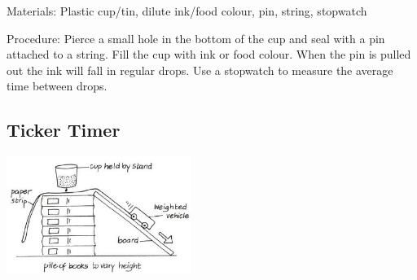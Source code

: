 \begin{multicols}{2}
\begin{description*}
\item[Materials:]{Plastic cup/tin, dilute ink/food colour, pin, string, stopwatch}
\item[Procedure:]{Pierce a small hole in the bottom of the cup and seal with a pin attached to a string. Fill the cup with ink or food colour. When the pin is pulled out the ink will fall in regular drops. Use a stopwatch to measure the average time between drops.}
\end{description*}

\columnbreak

\subsection{Ticker Timer}

\begin{center}
\includegraphics[width=0.45\textwidth]{./img/vso/ticker-timer.jpg}
\end{center}


\end{multicols}
